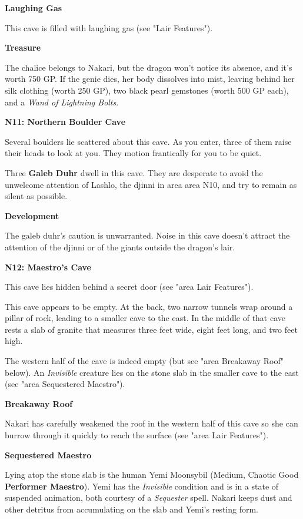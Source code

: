 \documentclass[letterpaper, 11pt, twocolumn]{dndbook}
\begin{document}
\textbf{Laughing Gas}

This cave is filled with laughing gas (see "Lair Features").

\textbf{Treasure}

The chalice belongs to Nakari, but the dragon won't notice its absence, and it's worth 750 GP. If the genie dies, her body dissolves into mist, leaving behind her silk clothing (worth 250 GP), two black pearl gemstones (worth 500 GP each), and a \textit{Wand of Lightning Bolts}.

\textbf{N11: Northern Boulder Cave}

\begin{DndReadAloud}
Several boulders lie scattered about this cave. As you enter, three of them raise their heads to look at you. They motion frantically for you to be quiet.
\end{DndReadAloud}

Three \textbf{Galeb Duhr} dwell in this cave. They are desperate to avoid the unwelcome attention of Lashlo, the djinni in area area N10, and try to remain as silent as possible.

\textbf{Development}

The galeb duhr's caution is unwarranted. Noise in this cave doesn't attract the attention of the djinni or of the giants outside the dragon's lair.

\textbf{N12: Maestro's Cave}

This cave lies hidden behind a secret door (see "area Lair Features").

\begin{DndReadAloud}
This cave appears to be empty. At the back, two narrow tunnels wrap around a pillar of rock, leading to a smaller cave to the east. In the middle of that cave rests a slab of granite that measures three feet wide, eight feet long, and two feet high.
\end{DndReadAloud}

The western half of the cave is indeed empty (but see "area Breakaway Roof" below). An \textit{Invisible} creature lies on the stone slab in the smaller cave to the east (see "area Sequestered Maestro").

\textbf{Breakaway Roof}

Nakari has carefully weakened the roof in the western half of this cave so she can burrow through it quickly to reach the surface (see "area Lair Features").

\textbf{Sequestered Maestro}

Lying atop the stone slab is the human Yemi Moonsybil (Medium, Chaotic Good \textbf{Performer Maestro}). Yemi has the \textit{Invisible} condition and is in a state of suspended animation, both courtesy of a \textit{Sequester} spell. Nakari keeps dust and other detritus from accumulating on the slab and Yemi's resting form.
\end{document}
